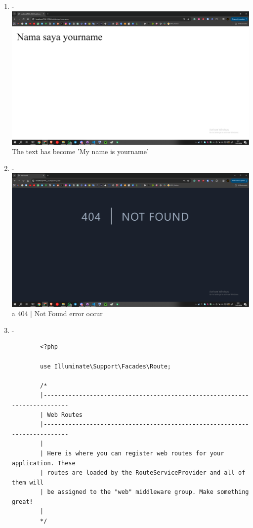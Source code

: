 \documentclass[12pt,titlepage]{article}
\begin{document}
\begin{enumerate}[label=\alph*.]
\begin{verbatim}
        Route::get('/user/{name}', function ($name) {
            return 'My name is ' . $name;
        }); 
    \end{verbatim}
    \item - \\ \includegraphics[width=.9\textwidth]{images/figures/route parameters b.png} \\ The text has become 'My name is yourname'
    \item - \\ \includegraphics[width=.9\textwidth]{images/figures/route parameters c.png} \\ a 404 | Not Found error occur
    \item -
    \begin{verbatim}
        <?php

        use Illuminate\Support\Facades\Route;
        
        /*
        |--------------------------------------------------------------------------
        | Web Routes
        |--------------------------------------------------------------------------
        |
        | Here is where you can register web routes for your application. These
        | routes are loaded by the RouteServiceProvider and all of them will
        | be assigned to the "web" middleware group. Make something great!
        |
        */
        

\end{verbatim}
\end{enumerate}
\end{document}
